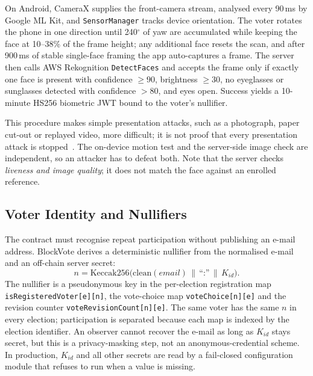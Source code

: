 \documentclass[conference]{IEEEtran}
\newcommand{\code}[1]{\texttt{\small #1}}
\begin{document}
On Android, CameraX supplies the front-camera stream, analysed every 90\,ms by Google ML Kit, and \code{SensorManager} tracks device orientation. The voter rotates the phone in one direction until 240$^\circ$ of yaw are accumulated while keeping the face at 10--38\% of the frame height; any additional face resets the scan, and after 900\,ms of stable single-face framing the app auto-captures a frame. The server then calls AWS Rekognition \code{DetectFaces} and accepts the frame only if exactly one face is present with confidence $\geq 90$, brightness $\geq 30$, no eyeglasses or sunglasses detected with confidence $>80$, and eyes open. Success yields a 10-minute HS256 biometric JWT bound to the voter's nullifier.

This procedure makes simple presentation attacks, such as a photograph, paper cut-out or replayed video, more difficult; it is not proof that every presentation attack is stopped~\cite{iso30107}. The on-device motion test and the server-side image check are independent, so an attacker has to defeat both. Note that the server checks \emph{liveness and image quality}; it does not match the face against an enrolled reference.

\subsection{Voter Identity and Nullifiers}
The contract must recognise repeat participation without publishing an e-mail address. BlockVote derives a deterministic nullifier from the normalised e-mail and an off-chain server secret:
\begin{equation}
n = \mathrm{Keccak256}\big(\mathrm{clean}(\mathit{email})\,\|\,\text{``:''}\,\|\,K_{id}\big).
\label{eq:nullifier}
\end{equation}
The nullifier is a pseudonymous key in the per-election registration map \code{isRegisteredVoter[e][n]}, the vote-choice map \code{voteChoice[n][e]} and the revision counter \code{voteRevisionCount[n][e]}. The same voter has the same $n$ in every election; participation is separated because each map is indexed by the election identifier. An observer cannot recover the e-mail as long as $K_{id}$ stays secret, but this is a privacy-masking step, not an anonymous-credential scheme. In production, $K_{id}$ and all other secrets are read by a fail-closed configuration module that refuses to run when a value is missing.
\end{document}
